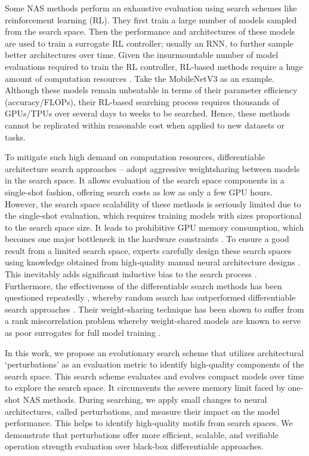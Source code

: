 \documentclass[onecolumn]{IEEEtran}
\begin{document}
Some NAS methods perform an exhaustive evaluation using search schemes like reinforcement learning (RL). They first train a large number of models sampled from the search space. Then the performance and architectures of these models are used to train a surrogate RL controller; usually an RNN, to further sample better architectures over time. Given the insurmountable number of model evaluations required to train the RL controller, RL-based methods require a huge amount of computation resources \cite{Zoph2017}. Take the MobileNetV3 \cite{Howard2019} as an example. Although these models remain unbeatable in terms of their parameter efficiency (accuracy/FLOPs), their RL-based searching process requires thousands of GPUs/TPUs over several days to weeks to be searched. Hence, these methods cannot be replicated within reasonable cost when applied to new datasets or tasks.

To mitigate such high demand on computation resources, differentiable architecture search approaches \cite{Liu2018}–\cite{Zela2019} adopt aggressive weightsharing \cite{Pham2018} between models in the search space. It allows evaluation of the search space components in a single-shot fashion, offering search costs as low as only a few GPU hours. However, the search space scalability of these methods is seriously limited due to the single-shot evaluation, which requires training models with sizes proportional to the search space size. It leads to prohibitive GPU memory consumption, which becomes one major bottleneck in the hardware constraints \cite{Cai2018, Xu2019}. To ensure a good result from a limited search space, experts carefully design these search spaces using knowledge obtained from high-quality manual neural architecture designs \cite{Zela2020, Siems2020}. This inevitably adds significant inductive bias to the search process \cite{Zoph2017}. Furthermore, the effectiveness of the differentiable search methods has been questioned repeatedly \cite{Zela2019, Li2020}, whereby random search has outperformed differentiable search approaches \cite{Li2020}. Their weight-sharing technique \cite{Pham2018} has been shown to suffer from a rank miscorrelation problem whereby weight-shared models are known to serve as poor surrogates for full model training \cite{Zela2020, Zhang2020, Pourchot2020}.

In this work, we propose an evolutionary search scheme that utilizes architectural ‘perturbations’ as an evaluation metric to identify high-quality components of the search space. This search scheme evaluates and evolves compact models over time to explore the search space. It circumvents the severe memory limit faced by one-shot NAS methods. During searching, we apply small changes to neural architectures, called perturbations, and measure their impact on the model performance. This helps to identify high-quality motifs from search spaces. We demonstrate that perturbations offer more efficient, scalable, and verifiable operation strength evaluation over black-box differentiable approaches.
\end{document}
